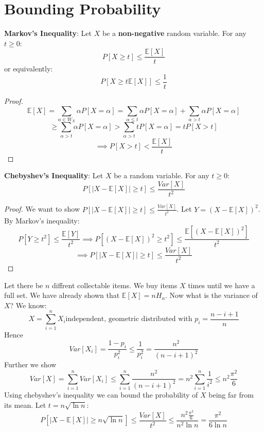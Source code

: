 \section{Bounding Probability}

\begin{theorem}
    \textbf{Markov's Inequality}: Let $X$ be a \textbf{non-negative} random variable. For any $t \geq 0$:
    $$P[X \geq t] \leq \frac{\mathbb{E}[X]}{t}$$
    or equivalently:
    $$P[X \geq t \mathbb{E}[X]] \leq \frac{1}{t}$$
\end{theorem}

\begin{proof}
    $$\mathbb{E}[X] = \sum_{\alpha \in W_X} \alpha P[X=\alpha] = \sum_{\alpha \le t} \alpha P[X=\alpha] + \sum_{\alpha > t} \alpha P[X=\alpha]$$
    $$\geq \sum_{\alpha > t} \alpha P[X=\alpha] > \sum_{\alpha > t} t P[X=\alpha] = t P[X > t]$$
    $$\implies P[X > t] < \frac{\mathbb{E}[X]}{t}$$
\end{proof}

\begin{theorem}
    \textbf{Chebyshev's Inequality}: Let $X$ be a random variable. For any $t \geq 0$:
    $$P[|X-\mathbb{E}[X]| \geq t] \leq \frac{Var[X]}{t^2}$$
\end{theorem}

\begin{proof}
We want to show $P[|X-\mathbb{E}[X]| \geq t] \leq \frac{Var[X]}{t^2}$.
Let $Y = (X-\mathbb{E}[X])^2$. By Markov's inequality:
$$P[Y \geq t^2] \leq \frac{\mathbb{E}[Y]}{t^2}  \implies  P[(X-\mathbb{E}[X])^2 \geq t^2] \leq \frac{\mathbb{E}[(X-\mathbb{E}[X])^2]}{t^2}$$
$$\implies P[|X-\mathbb{E}[X]| \geq t] \leq \frac{Var[X]}{t^2}$$
\end{proof}

\begin{example}
    Let there be $n$ diffrent collectable items. We buy items $X$ times until we have a full set. We have already shown that $\mathbb{E}[X] = n H_n$. Now what is the variance of $X$?
    We know:
    $$X = \sum_{i=1}^n X_i \text{independent, geometric distributed with } p_i = \frac{n-i+1}{n}$$
    Hence
    $$Var[X_i] = \frac{1-p_i}{p_i^2} \leq \frac{1}{p_i^2} = \frac{n^2}{(n-i+1)^2}$$
    Further we show
    $$Var[X] = \sum_{i=1}^n Var[X_i] \leq \sum_{i=1}^n \frac{n^2}{(n-i+1)^2} = n^2 \sum_{i=1}^n \frac{1}{i^2} \leq n^2 \frac{\pi^2}{6}$$
    Using chebyshev's inequality we can bound the probability of $X$ being far from its mean. Let $t = n  \sqrt{\ln n}$:
    $$P[|X-\mathbb{E}[X]| \geq n \sqrt{\ln n}] \leq \frac{Var[X]}{t^2} \leq \frac{n^2 \frac{\pi^2}{6}}{n^2 \ln n} = \frac{\pi^2}{6 \ln n}$$
    
\end{example}

